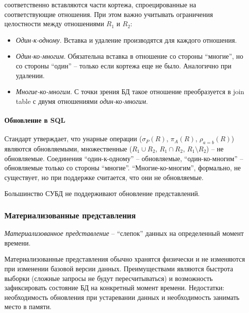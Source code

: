 \begin{itemize}
	      соответственно вставляются части кортежа, спроецированные на соответствующие отношения. При этом
	      важно учитывать ограничения целостности между отношениями $R_1$ и
	      $R_2$:
	      \begin{itemize}
		      \item \textit{Один-к-одному}. Вставка и удаление производятся для каждого отношения.
		      \item \textit{Один-ко-многим}. Обязательна вставка в отношение со стороны ``многие'',
		            но со стороны ``один'' -- только если кортежа еще не было. Аналогично при удалении.
		      \item \textit{Многие-ко-многим}. С точки зрения БД такое отношение преобразуется в join
		            table с двумя отношениями \textit{один-ко-многим}.
	      \end{itemize}
\end{itemize}

\paragraph{Обновление в SQL}

Стандарт утверждает, что унарные операции ($\sigma_P (R)$, $\pi_A(R)$,
$\rho_{a=b}(R)$) являются обновляемыми, множественные ($R_1 \cup R_2$,
$R_1 \cap R_2$, $R_1 \setminus R_2$) -- не обновляемые. Соединения ``один-к-одному'' --
обновляемые, ``один-ко-многим'' -- обновляемые только со стороны ``многие''. ``Многие-ко-многим'',
формально, не существует, но при поддержке считается, что они не обновляемые.

\begin{remark}
	Большинство СУБД не поддерживают обновление представлений.
\end{remark}

\subsubsection{Материализованные представления}

\begin{definition}
	\textit{Материализованное представление} -- ``слепок'' данных на определенный момент времени.
\end{definition}

Материализованные представления обычно хранятся физически и не изменяются при изменении базовой
версии данных. Преимуществами являются быстрота выборки (сложные запросы не будут пересчитываться)
и возможность зафиксировать состояние БД на конкретный момент времени. Недостатки: необходимость
обновления при устаревании данных и необходимость занимать место в памяти.

